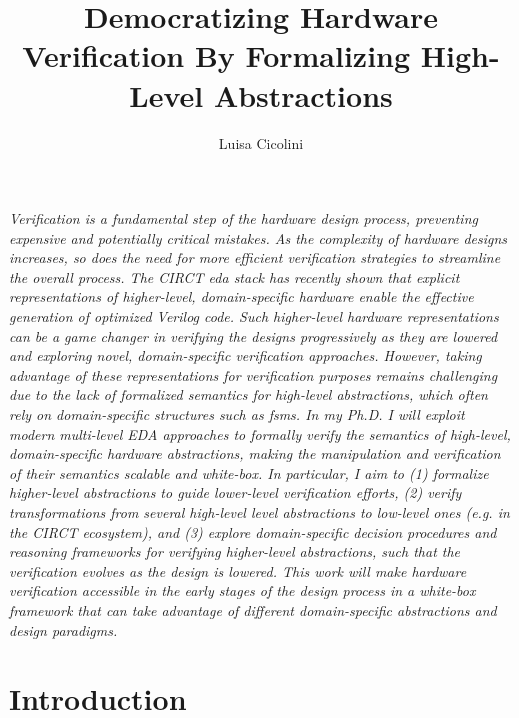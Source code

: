 \documentclass[sigconf,authorversion,nonacm, 11pt]{acmart}
\begin{document}
\title{Democratizing Hardware Verification By Formalizing High-Level Abstractions}

\author{Luisa Cicolini}

\maketitle
\thispagestyle{empty}

\textit{
    Verification is a fundamental step of the hardware design process, preventing expensive and potentially critical mistakes.
    As the complexity of hardware designs increases, so does the need for more efficient verification strategies to streamline the overall process.
    The CIRCT \ac{eda} stack has recently shown that explicit representations of higher-level, domain-specific hardware enable the effective generation of optimized Verilog code.
    Such higher-level hardware representations can be a game changer in verifying the designs progressively as they are lowered and exploring novel, domain-specific verification approaches. 
    However, taking advantage of these representations for verification purposes remains challenging due to the lack of formalized semantics for high-level abstractions, which often rely on domain-specific structures such as \acp{fsm}.
    In my Ph.D. I will exploit modern multi-level EDA approaches to formally verify the semantics of high-level, domain-specific hardware abstractions, making the manipulation and verification of their semantics scalable and white-box.
    In particular, I aim to
    (1) formalize higher-level abstractions to guide lower-level verification efforts, 
    (2) verify transformations from several high-level level abstractions to low-level ones (e.g. in the CIRCT ecosystem), and
    (3) explore domain-specific decision procedures and reasoning frameworks for verifying higher-level abstractions, such that the verification evolves as the design is lowered. 
    This work will make hardware verification accessible in the early stages of the design process in a white-box framework that can take advantage of different domain-specific abstractions and design paradigms.
}   


\section{Introduction}
\end{document}
